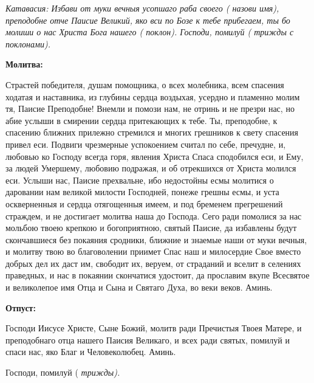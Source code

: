 \itshape Катавасия:\normalfont{} Избави от муки вечныя усопшаго раба своего ( \itshape назови имя\normalfont{}), преподобне отче Паисие Великий, яко вси по Бозе к тебе прибегаем, ты бо молиши о нас Христа Бога нашего ( \itshape поклон\normalfont{}). Господи, помилуй ( \itshape трижды с поклонами\normalfont{}).





\bfseries Молитва:\normalfont{}


Страстей победителя, душам помощника, о всех молебника, всем спасения ходатая и наставника, из глубины сердца воздыхая, усердно и пламенно молим тя, Паисие Преподобне! Внемли и помози нам, не отринь и не презри нас, но абие услыши в смирении сердца притекающих к тебе. Ты, преподобне, к спасению ближних прилежно стремился и многих грешников к свету спасения привел еси. Подвиги чрезмерные успокоением считал по себе, пречудне, и, любовью ко Господу всегда горя, явления Христа Спаса сподобился еси, и Ему, за людей Умершему, любовию подражая, и об отрекшихся от Христа молился еси. Услыши нас, Паисие прехвальне, ибо недостойны есмы молитися о даровании нам великой милости Господней, понеже грешны есмы, и уста оскверненныя и сердца отягощенныя имеем, и под бременем прегрешений страждем, и не достигает молитва наша до Господа. Сего ради помолися за нас мольбою твоею крепкою и богоприятною, святый Паисие, да избавлены будут скончавшиеся без покаяния сродники, ближние и знаемые наши от муки вечныя, и молитву твою во благоволении приимет Спас наш и милосердие Свое вместо добрых дел их даст им, свободит их, веруем, от страданий и вселит в селениях праведных, и нас в покаянии скончатися удостоит, да прославим вкупе Всесвятое и великолепое имя Отца и Сына и Святаго Духа, во веки веков. Аминь.





\bfseries Отпуст:\normalfont{}


Господи Иисусе Христе, Сыне Божий, молитв ради Пречистыя Твоея Матере, и преподобнаго отца нашего Паисия Великаго, и всех ради святых, помилуй и спаси нас, яко Благ и Человеколюбец. Аминь.


Господи, помилуй ( \itshape трижды\normalfont{}).


 